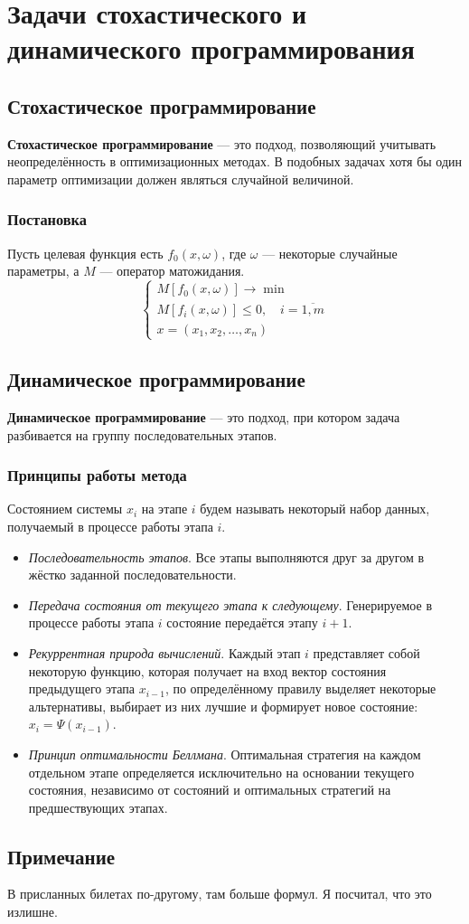 \documentclass[17pt]{extarticle}
\begin{document}
\section{Задачи стохастического и динамического программирования}

\subsection{Стохастическое программирование}

\textbf{Стохастическое программирование} — это подход, позволяющий учитывать неопределённость в оптимизационных методах. В подобных задачах хотя бы один параметр оптимизации должен являться случайной величиной.

\subsubsection{Постановка}
Пусть целевая функция есть \( f_0(x, \omega) \), где \( \omega \) — некоторые случайные параметры, а \( M \) — оператор матожидания.
\[
    \begin{cases}
        M[f_0(x, \omega)] \to \min                        \\
        M[f_i(x, \omega)] \le 0, \quad i = \overline{1,m} \\
        x = (x_1, x_2, \dots, x_n)
    \end{cases}
\]

\subsection{Динамическое программирование}

\textbf{Динамическое программирование} — это подход, при котором задача разбивается на группу последовательных этапов.

\subsubsection{Принципы работы метода}
Состоянием системы \( x_i \) на этапе \( i \) будем называть некоторый набор данных, получаемый в процессе работы этапа \( i \).

\begin{itemize}
    \item \textit{Последовательность этапов}. Все этапы выполняются друг за другом в жёстко заданной последовательности.
    \item \textit{Передача состояния от текущего этапа к следующему}. Генерируемое в процессе работы этапа \( i \) состояние передаётся этапу \( i+1 \).
    \item \textit{Рекуррентная природа вычислений}. Каждый этап \( i \) представляет собой некоторую функцию, которая получает на вход вектор состояния предыдущего этапа \( x_{i-1} \), по определённому правилу выделяет некоторые альтернативы, выбирает из них лучшие и формирует новое состояние: \( x_i = \Psi(x_{i-1}) \).
    \item \textit{Принцип оптимальности Беллмана}. Оптимальная стратегия на каждом отдельном этапе определяется исключительно на основании текущего состояния, независимо от состояний и оптимальных стратегий на предшествующих этапах.
\end{itemize}

\subsection{Примечание}
В присланных билетах по-другому, там больше формул. Я посчитал, что это излишне.
\end{document}
